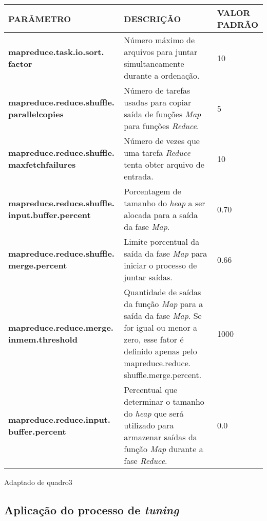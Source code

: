 {\footnotesize
  \centering
  \begin{tabular}{|p{40mm}|p{50mm}|p{30mm}|}\hline
    \textbf{PARÂMETRO}                                      & \textbf{DESCRIÇÃO}                                                                                                                                                                      & \textbf{VALOR PADRÃO} \\\hline
    \textbf{mapreduce.task.io.sort. factor}                 & Número máximo de arquivos para juntar simultaneamente durante a ordenação.                                                                                                              & 10                    \\\hline
    \textbf{mapreduce.reduce.shuffle. parallelcopies}       & Número de tarefas usadas para copiar saída de funções \textit{Map} para funções \textit{Reduce}.                                                                                        & 5                     \\\hline
    \textbf{mapreduce.reduce.shuffle. maxfetchfailures}     & Número de vezes que uma tarefa \textit{Reduce} tenta obter arquivo de entrada.                                                                                                          & 10                    \\\hline
    \textbf{mapreduce.reduce.shuffle. input.buffer.percent} & Porcentagem de tamanho do \textit{heap} a ser alocada para a saída da fase \textit{Map}.                                                                                                & 0.70                  \\\hline
    \textbf{mapreduce.reduce.shuffle. merge.percent}        & Limite porcentual da saída da fase \textit{Map} para iniciar o processo de juntar saídas.                                                                                               & 0.66                  \\\hline
    \textbf{mapreduce.reduce.merge. inmem.threshold}        & Quantidade de saídas da função \textit{Map} para a saída da fase \textit{Map}. Se for igual ou menor a zero, esse fator é definido apenas pelo mapreduce.reduce. shuffle.merge.percent. & 1000                  \\\hline
    \textbf{mapreduce.reduce.input. buffer.percent}         & Percentual que determinar o tamanho do \textit{heap} que será utilizado para armazenar saídas da função \textit{Map} durante a fase \textit{Reduce}.                                    & 0.0                   \\\hline
  \end{tabular}}
{Adaptado de \cite{HadoopBook15}}{quadro3}{}{}

\subsection{Aplicação do processo de \textit{tuning}}\label{ssec:aplicacao tuning}
